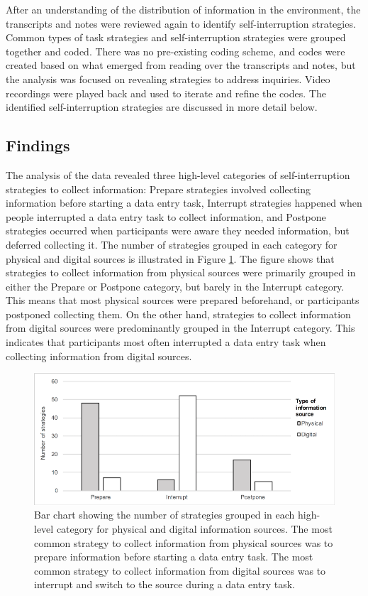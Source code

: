 
After an understanding of the distribution of information in the environment, the transcripts and notes were reviewed again to identify self-interruption strategies. Common types of task strategies and self-interruption strategies were grouped together and coded. There was no pre-existing coding scheme, and codes were created based on what emerged from reading over the transcripts and notes, but the analysis was focused on revealing strategies to address inquiries. Video recordings were played back and used to iterate and refine the codes. The identified self-interruption strategies are discussed in more detail below. 

\subsection{Findings}
The analysis of the data revealed three high-level categories of self-interruption strategies to collect information: Prepare strategies involved collecting information before starting a data entry task, Interrupt strategies happened when people interrupted a data entry task to collect information, and Postpone strategies occurred when participants were aware they needed information, but deferred collecting it. The number of strategies grouped in each category for physical and digital sources is illustrated in Figure \ref{fig:ch12_graph}. The figure shows that strategies to collect information from physical sources were primarily grouped in either the Prepare or Postpone category, but barely in the Interrupt category. This means that most physical sources were prepared beforehand, or participants postponed collecting them. On the other hand, strategies to collect information from digital sources were predominantly grouped in the Interrupt category. This indicates that participants most often interrupted a data entry task when collecting information from digital sources. 

\begin{figure}
\centering
\includegraphics[scale=0.8]{images/ch12/ch12_graph.pdf}
\caption{Bar chart showing the number of strategies grouped in each high-level category for physical and digital information sources. The most common strategy to collect information from physical sources was to prepare information before starting a data entry task. The most common strategy to collect information from digital sources was to interrupt and switch to the source during a data entry task.}
\label{fig:ch12_graph}
\end{figure}

